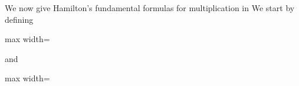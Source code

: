 \documentclass[11pt,oneside]{article}
\begin{document}
\begin{BookBody}
We now give Hamilton’s fundamental formulas for multiplication in  We start by defining

\begin{center}\begin{adjustbox}{max width=\linewidth}\end{adjustbox}\end{center}

\noindent and

\begin{center}\begin{adjustbox}{max width=\linewidth}\end{adjustbox}\end{center}

\end{BookBody}

\BookNarrativetrue
\end{document}
